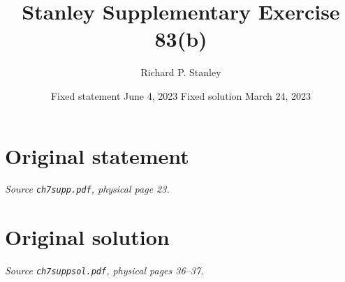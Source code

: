 \documentclass[11pt,a4paper]{article}
\author{Richard P. Stanley}
\date{Fixed statement June 4, 2023 \qquad Fixed solution March 24, 2023}
\title{Stanley Supplementary Exercise 83(b)}
\begin{document}
\maketitle
\section*{Original statement}
\noindent\emph{Source \texttt{ch7supp.pdf}, physical page 23.}\par\medskip

\clearpage
\section*{Original solution}
\noindent\emph{Source \texttt{ch7suppsol.pdf}, physical pages 36--37.}\par\medskip

\end{document}
